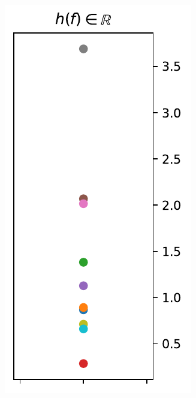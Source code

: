 \documentclass{beamer}
\begin{document}
\begin{frame}
\begin{columns}
    \includegraphics[width=.99\textwidth]{figures/response.pdf}
  \end{columns}

  \end{frame}
\end{document}
